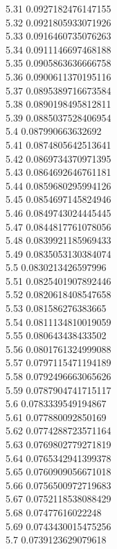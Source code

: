 {5.31	0.0927182476147155\\
5.32	0.0921805933071926\\
5.33	0.0916460735076263\\
5.34	0.0911146697468188\\
5.35	0.0905863636666758\\
5.36	0.0900611370195116\\
5.37	0.0895389716673584\\
5.38	0.0890198495812811\\
5.39	0.0885037528406954\\
5.4	0.087990663632692\\
5.41	0.0874805642513641\\
5.42	0.0869734370971395\\
5.43	0.0864692646761181\\
5.44	0.0859680295994126\\
5.45	0.0854697145824946\\
5.46	0.0849743024445445\\
5.47	0.0844817761078056\\
5.48	0.0839921185969433\\
5.49	0.0835053130384074\\
5.5	0.0830213426597996\\
5.51	0.0825401907892446\\
5.52	0.0820618408547658\\
5.53	0.081586276383665\\
5.54	0.0811134810019059\\
5.55	0.080643438433502\\
5.56	0.0801761324999088\\
5.57	0.0797115471194189\\
5.58	0.0792496663065626\\
5.59	0.0787904741715117\\
5.6	0.0783339549194867\\
5.61	0.077880092850169\\
5.62	0.0774288723571164\\
5.63	0.0769802779271819\\
5.64	0.0765342941399378\\
5.65	0.0760909056671018\\
5.66	0.0756500972719683\\
5.67	0.0752118538088429\\
5.68	0.07477616022248\\
5.69	0.0743430015475256\\
5.7	0.0739123629079618\\
}
